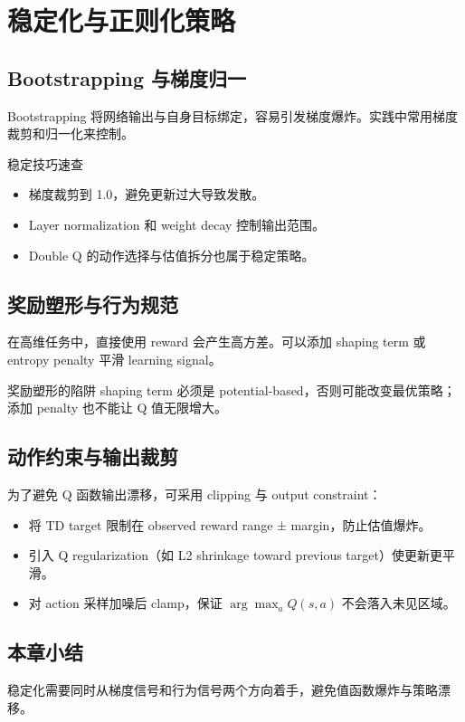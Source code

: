 \section{稳定化与正则化策略}

\subsection{Bootstrapping 与梯度归一}

Bootstrapping 将网络输出与自身目标绑定，容易引发梯度爆炸。实践中常用梯度裁剪和归一化来控制。

\begin{importantbox}{稳定技巧速查}
\begin{itemize}
    \item 梯度裁剪到 1.0，避免更新过大导致发散。
    \item Layer normalization 和 weight decay 控制输出范围。
    \item Double Q 的动作选择与估值拆分也属于稳定策略。
\end{itemize}
\end{importantbox}

\subsection{奖励塑形与行为规范}

在高维任务中，直接使用 reward 会产生高方差。可以添加 shaping term 或 entropy penalty 平滑 learning signal。

\begin{warningbox}{奖励塑形的陷阱}
shaping term 必须是 potential-based，否则可能改变最优策略；添加 penalty 也不能让 Q 值无限增大。
\end{warningbox}

\subsection{动作约束与输出裁剪}

为了避免 Q 函数输出漂移，可采用 clipping 与 output constraint：

\begin{itemize}
    \item 将 TD target 限制在 observed reward range ± margin，防止估值爆炸。
    \item 引入 Q regularization（如 L2 shrinkage toward previous target）使更新更平滑。
    \item 对 action 采样加噪后 clamp，保证 $\arg\max_a Q(s,a)$ 不会落入未见区域。
\end{itemize}

\subsection{本章小结}

稳定化需要同时从梯度信号和行为信号两个方向着手，避免值函数爆炸与策略漂移。

